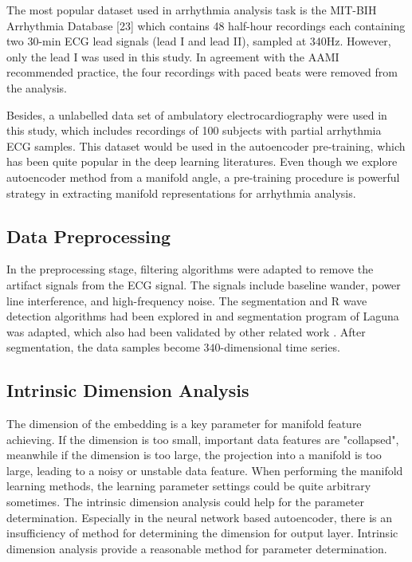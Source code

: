 \documentclass[journal]{IEEEtran}
\begin{document}
The most popular dataset used in arrhythmia analysis task is the MIT-BIH Arrhythmia Database [23] which contains 48 half-hour recordings each containing two 30-min ECG lead signals (lead I and lead II), sampled at 340Hz. 
However, only the lead I was used in this study. 
In agreement with the AAMI recommended practice, the four recordings with paced beats were removed from the analysis. 

Besides, a unlabelled data set of ambulatory electrocardiography were used in this study, which includes recordings of 100 subjects with partial arrhythmia ECG samples. 
This dataset would be used in the autoencoder pre-training, which has been quite popular in the deep learning literatures.
Even though we explore autoencoder method from a manifold angle, a pre-training procedure is powerful strategy in extracting manifold representations for arrhythmia analysis.



%
%
\subsection{Data Preprocessing}
In the preprocessing stage, filtering algorithms were adapted to remove the artifact signals from the ECG signal. 
The signals include baseline wander, power line interference, and high-frequency noise. 
The segmentation and R wave detection algorithms had been explored in \cite{afonso} and segmentation program of Laguna \cite{sornmo2006electrocardiogram} was adapted, which also had been validated by other related work \cite{chaza}. 
After segmentation, the data samples become $340$-dimensional time series.



%
%
\subsection{Intrinsic Dimension Analysis}
The dimension of the embedding is a key parameter for manifold feature achieving.  
If the dimension is too small, important data features are "collapsed", meanwhile if the dimension is too large, the projection into a manifold is too large, leading to a noisy or unstable data feature.
When performing the manifold learning methods, the learning parameter settings could be quite arbitrary sometimes.
The intrinsic dimension analysis could help for the parameter determination.
Especially in the neural network based autoencoder, there is an insufficiency of method for determining the dimension for output layer.
Intrinsic dimension analysis provide a reasonable method for parameter determination.
\end{document}
